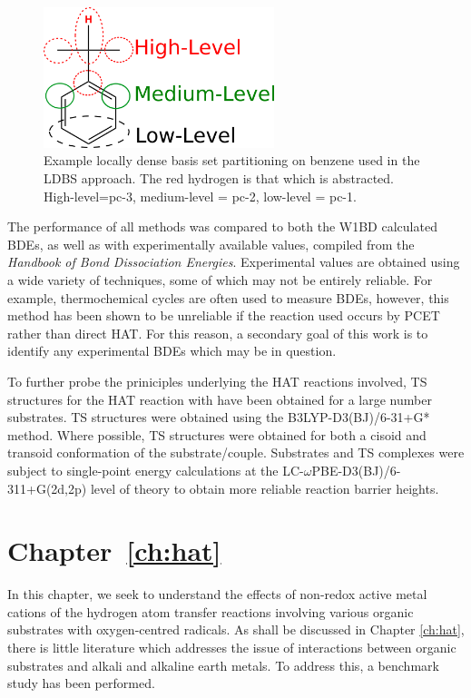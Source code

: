 \begin{figure}[htb]
  \centering
  \includegraphics[width=0.6\textwidth]{figures/ldbs}
  \caption[Example locally dense basis set partitioning on benzene used in the
  LDBS approach.]{Example locally dense basis set partitioning on benzene used
    in the LDBS approach. The red hydrogen is that which is
    abstracted. High-level=pc-3, medium-level = pc-2, low-level = pc-1.}
\label{fig:ldbs}
\end{figure}


The performance of all methods was compared to both the W1BD calculated BDEs, as
well as with experimentally available values, compiled from the \emph{Handbook
  of Bond Dissociation Energies}.\cite{Luo2002} Experimental values are obtained
using a wide variety of techniques, some of which may not be entirely
reliable. For example, thermochemical cycles\cite{Bordwell1988} are often used
to measure BDEs, however, this method has been shown to be unreliable if the
reaction used occurs by PCET rather than direct HAT.\cite{Miller2016} For this
reason, a secondary goal of this work is to identify any experimental BDEs which
may be in question.

To further probe the priniciples underlying the HAT reactions involved, TS
structures for the HAT reaction with \cumo have been obtained for a large number
substrates. TS structures were obtained using the B3LYP-D3(BJ)/6-31+G*
method. Where possible, TS structures were obtained for both a cisoid and
transoid conformation of the substrate/\cumo couple. Substrates and TS complexes
were subject to single-point energy calculations at the
LC-$\omega$PBE-D3(BJ)/6-311+G(2d,2p) level of theory to obtain more reliable
reaction barrier heights.

\section{Chapter~\ref{ch:hat}}

In this chapter, we seek to understand the effects of non-redox active metal
cations of the hydrogen atom transfer reactions involving various organic
substrates with oxygen-centred radicals. As shall be discussed in Chapter
\ref{ch:hat}, there is little literature which addresses the issue of
interactions between organic substrates and alkali and alkaline earth metals. To
address this, a benchmark study has been performed.

